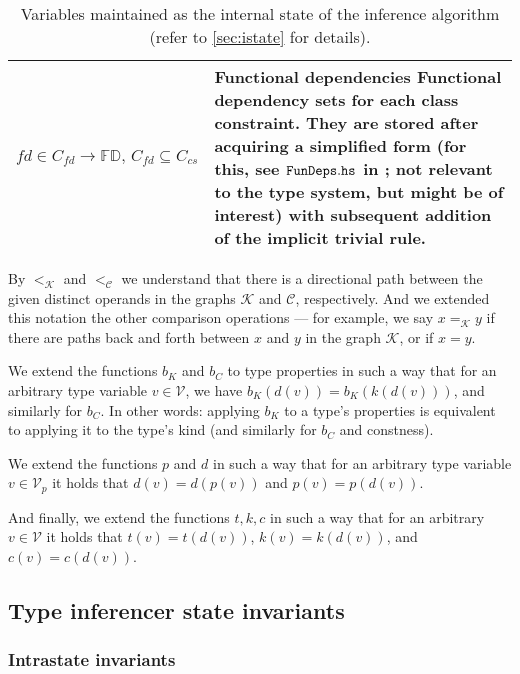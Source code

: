 \begin{table}
\begin{tabular}{p{.23\linewidth}p{.7\linewidth}}
  $fd \in C_{fd} \to \mathbb{FD},\,C_{fd} \subseteq C_{cs}$ & \textbf{Functional dependencies}\quad
  Functional dependency sets for each class constraint. They are stored after acquiring a simplified form (for this, see $\mathtt{FunDeps.hs}$ in \cite{klepl2022compiler}; not relevant to the type system, but might be of interest) with subsequent addition of the implicit trivial rule. \\
\bottomrule
\end{tabular}
\caption{Variables maintained as the internal state of the inference algorithm (refer to \cref{sec:istate} for details).}
\label{tab:istate}
\end{table}

By $<_{\mathcal{K}}$ and $<_{\mathcal{C}}$ we understand that there is a directional path between the given distinct operands in the graphs $\mathcal{K}$ and $\mathcal{C}$, respectively. And we extended this notation the other comparison operations --- for example, we say $x =_{\mathcal{K}} y$ if there are paths back and forth between $x$ and $y$ in the graph $\mathcal{K}$, or if $x = y$.


\begin{defn}
    We extend the functions $b_K$ and $b_C$ to type properties in such a way that for an arbitrary type variable $v \in \mathcal{V}$, we have $b_K (d (v)) = b_K (k (d (v)))$, and similarly for $b_C$. In other words: applying $b_K$ to a type's properties is equivalent to applying it to the type's kind (and similarly for $b_C$ and constness).

    We extend the functions $p$ and $d$ in such a way that for an arbitrary type variable $v \in \mathcal{V}_p$ it holds that $d(v) = d(p(v))$ and $p(v) = p(d(v))$.

    And finally, we extend the functions $t, k, c$ in such a way that for an arbitrary $v \in \mathcal{V}$ it holds that $t (v) = t (d (v))$, $k (v) = k (d (v))$, and $c (v) = c (d (v))$.
\end{defn}

\subsection{Type inferencer state invariants}
\label{sec:invariants}

\subsubsection{Intrastate invariants}

